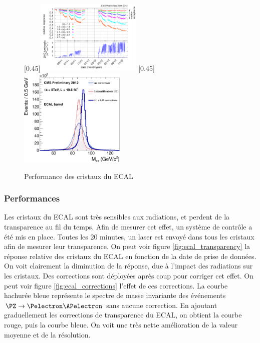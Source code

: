 \begin{figure}[t] \centering
  [0.45\textwidth]{\includegraphics[width=0.45\textwidth]{chapitre2/figs/ecal_transparency.png}} \hfill
  [0.45\textwidth]{\includegraphics[width=0.45\textwidth]{chapitre2/figs/ecal_corrections_effect.pdf}}
  \caption{Performance des cristaux du ECAL}
  \label{fig:ecal_performance}
\end{figure}

\subsubsection{Performances}

Les cristaux du ECAL sont très sensibles aux radiations, et perdent de la transparence au fil du temps. Afin de mesurer cet effet, un système de contrôle a été mis en place. Toutes les 20 minutes, un laser est envoyé dans tous les cristaux afin de mesurer leur transparence. On peut voir figure \ref{fig:ecal_transparency} la réponse relative des cristaux du ECAL en fonction de la date de prise de données. On voit clairement la diminution de la réponse, due à l'impact des radiations sur les cristaux. Des corrections sont déployées après coup pour corriger cet effet. On peut voir figure \ref{fig:ecal_corrections} l'effet de ces corrections. La courbe hachurée bleue représente le spectre de masse invariante des événements $\PZ \rightarrow \Pelectron \APelectron$ sans aucune correction. En ajoutant graduellement les corrections de transparence du ECAL, on obtient la courbe rouge, puis la courbe bleue. On voit une très nette amélioration de la valeur moyenne et de la résolution.

